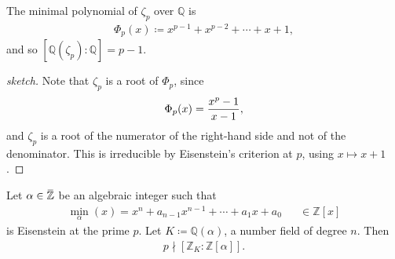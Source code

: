 \begin{lemma}[?]

The minimal polynomial of \(\zeta_p\) over \({\mathbb{Q}}\) is
\begin{align*}
\Phi_p(x) \coloneqq x^{p-1} + x^{p-2} + \cdots + x + 1
,\end{align*}
and so \([{\mathbb{Q}}(\zeta_p) : {\mathbb{Q}}] = p-1\).

\end{lemma}

\begin{proof}[sketch]

Note that \(\zeta_p\) is a root of \(\Phi_p\), since
\begin{align*}
\Phi_p(x) = {x^p-1 \over x - 1}
,\end{align*}
and \(\zeta_p\) is a root of the numerator of the right-hand side and
not of the denominator. This is irreducible by Eisenstein's criterion at
\(p\), using \(x\mapsto x+1\).

\end{proof}

\begin{proposition}[?]

Let
\(\alpha\in \mkern 1.5mu\overline{\mkern-1.5mu{\mathbb{Z}}\mkern-1.5mu}\mkern 1.5mu\)
be an algebraic integer such that
\begin{align*}
\min_ \alpha (x) = x^n + a_{n-1}x^{n-1} + \cdots + a_1x + a_0 && \in {\mathbb{Z}}[x]
\end{align*}
is Eisenstein at the prime \(p\). Let
\(K \coloneqq{\mathbb{Q}}( \alpha)\), a number field of degree \(n\).
Then
\begin{align*}
p\nmid[{\mathbb{Z}}_K : {\mathbb{Z}}[ \alpha] ]
.\end{align*}

\end{proposition}

